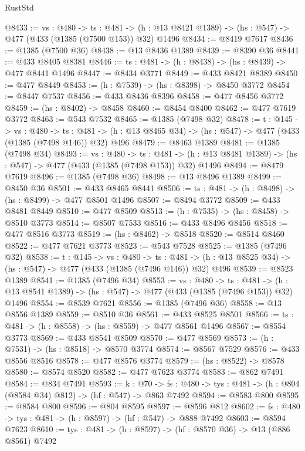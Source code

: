 \begin{lexlean}{RustStd}
\begin{coremodule}
{\begin{coremodule}
{{{{{{{{{{{{{{{{@8433 := {vs : @480} ->
  {ts : @481} -> (h : @13 @8421 @1389) -> (hs : @547) -> @477 (@433 (@1385 (@7500 @153)) @32) @1496
@8434 := @8419 @7617
@8436 := @1385 (@7500 @36)
@8438 := @13 @8436 @1389
@8439 := @8390 @36
@8441 := @433 @8405 @8381
@8446 := {ts : @481} -> (h : @8438) -> (hs : @8439) -> @477 @8441 @1496
@8447 := @8434 @3771
@8449 := @433 @8421 @8389
@8450 := @477 @8449
@8453 := (h : @7539) -> (hs : @8398) -> @8450 @3772
@8454 := @8447 @7537
@8456 := @433 @8436 @8396
@8458 := @477 @8456 @3772
@8459 := (hs : @8402) -> @8458
@8460 := @8454 @8400
@8462 := @477 @7619 @3772
@8463 := @543 @7532
@8465 := @1385 (@7498 @32)
@8478 := {t : @145} ->
  {vs : @480} ->
  {ts : @481} -> (h : @13 @8465 @34) -> (hs : @547) -> @477 (@433 (@1385 (@7498 @146)) @32) @496
@8479 := @8463 @1389
@8481 := @1385 (@7498 @34)
@8493 := {vs : @480} ->
  {ts : @481} -> (h : @13 @8481 @1389) -> (hs : @547) -> @477 (@433 (@1385 (@7498 @153)) @32) @1496
@8494 := @8479 @7619
@8496 := @1385 (@7498 @36)
@8498 := @13 @8496 @1389
@8499 := @8450 @36
@8501 := @433 @8465 @8441
@8506 := {ts : @481} -> (h : @8498) -> (hs : @8499) -> @477 @8501 @1496
@8507 := @8494 @3772
@8509 := @433 @8481 @8449
@8510 := @477 @8509
@8513 := (h : @7535) -> (hs : @8458) -> @8510 @3773
@8514 := @8507 @7533
@8516 := @433 @8496 @8456
@8518 := @477 @8516 @3773
@8519 := (hs : @8462) -> @8518
@8520 := @8514 @8460
@8522 := @477 @7621 @3773
@8523 := @543 @7528
@8525 := @1385 (@7496 @32)
@8538 := {t : @145} ->
  {vs : @480} ->
  {ts : @481} -> (h : @13 @8525 @34) -> (hs : @547) -> @477 (@433 (@1385 (@7496 @146)) @32) @496
@8539 := @8523 @1389
@8541 := @1385 (@7496 @34)
@8553 := {vs : @480} ->
  {ts : @481} -> (h : @13 @8541 @1389) -> (hs : @547) -> @477 (@433 (@1385 (@7496 @153)) @32) @1496
@8554 := @8539 @7621
@8556 := @1385 (@7496 @36)
@8558 := @13 @8556 @1389
@8559 := @8510 @36
@8561 := @433 @8525 @8501
@8566 := {ts : @481} -> (h : @8558) -> (hs : @8559) -> @477 @8561 @1496
@8567 := @8554 @3773
@8569 := @433 @8541 @8509
@8570 := @477 @8569
@8573 := (h : @7531) -> (hs : @8518) -> @8570 @3774
@8574 := @8567 @7529
@8576 := @433 @8556 @8516
@8578 := @477 @8576 @3774
@8579 := (hs : @8522) -> @8578
@8580 := @8574 @8520
@8582 := @477 @7623 @3774
@8583 := @862 @7491
@8584 := @834 @7491
@8593 := {k : @70} ->
  {fs : @480} -> {tys : @481} -> (h : @804 (@8584 @34) @812) -> (hf : @547) -> @863 @7492
@8594 := @8583 @800
@8595 := @8584 @800
@8596 := @804 @8595
@8597 := @8596 @812
@8602 := {fs : @480} -> {tys : @481} -> (h : @8597) -> (hf : @547) -> @888 @7492
@8603 := @8594 @7623
@8610 := {tys : @481} -> (h : @8597) -> (hf : @8570 @36) -> @13 (@886 @8561) @7492
}}}}}}}}}}}}}}}}
\end{coremodule}}
\end{coremodule}
\end{lexlean}

